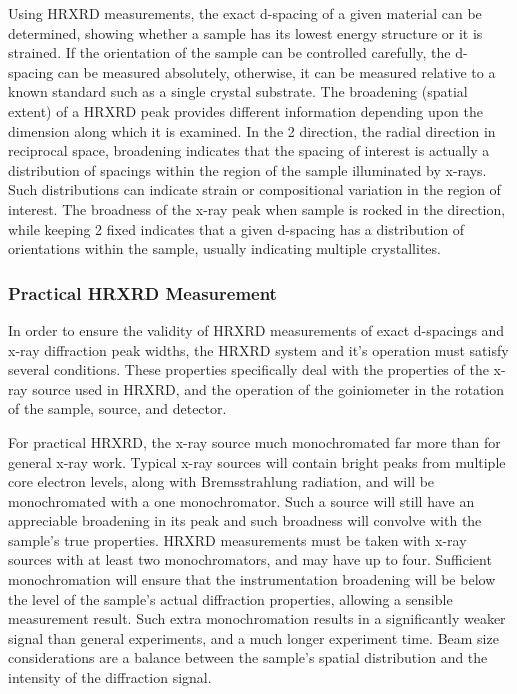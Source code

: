 Using HRXRD measurements, the exact d-spacing of a given material can be determined, showing whether a sample has its lowest energy structure or it is strained. If the orientation of the sample can be controlled carefully, the d-spacing can be measured absolutely, otherwise, it can be measured relative to a known standard such as a single crystal substrate. The broadening (spatial extent) of a HRXRD peak provides different information depending upon the dimension along which it is examined. In the 2\texttheta{} direction, the radial direction in reciprocal space, broadening indicates that the spacing of interest is actually a distribution of spacings within the region of the sample illuminated by x-rays. Such distributions can indicate strain or compositional variation in the region of interest. The broadness of the x-ray peak when sample is rocked in the \textomega{} direction, while keeping 2\texttheta{} fixed indicates that a given d-spacing has a distribution of orientations within the sample, usually indicating multiple crystallites.

\subsubsection{Practical HRXRD Measurement}
In order to ensure the validity of HRXRD measurements of exact d-spacings and x-ray diffraction peak widths, the HRXRD system and it's operation must satisfy several conditions. These properties specifically deal with the properties of the x-ray source used in HRXRD, and the operation of the goiniometer in the rotation of the sample, source, and detector.

For practical HRXRD, the x-ray source much monochromated far more than for general x-ray work. Typical x-ray sources will contain bright peaks from multiple core electron levels, along with Bremsstrahlung radiation, and will be monochromated with a one monochromator. Such a source will still have an appreciable broadening in its peak and such broadness will convolve with the sample's true properties. HRXRD measurements must be taken with x-ray sources with at least two monochromators, and may have up to four. Sufficient monochromation will ensure that the instrumentation broadening will be below the level of the sample's actual diffraction properties, allowing a sensible measurement result. Such extra monochromation results in a significantly weaker signal than general experiments, and a much longer experiment time. Beam size considerations are a balance between the sample's spatial distribution and the intensity of the diffraction signal.

